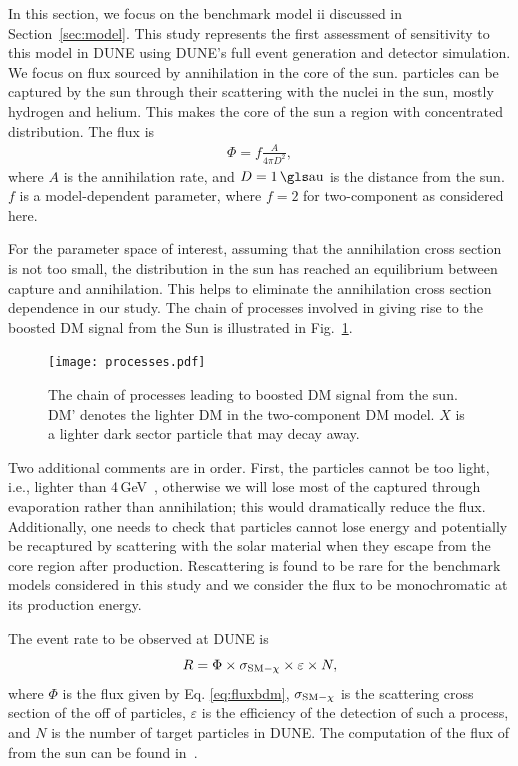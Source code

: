In this section, we focus on the benchmark model ii discussed in Section~\ref{sec:model}. This study represents the first assessment of sensitivity to this model in DUNE using DUNE's full event generation and detector simulation. We focus on  flux sourced by  annihilation in the core of the sun.   particles can be captured by the sun through their scattering with the nuclei in the sun, mostly hydrogen and helium. This makes the core of the sun a region with concentrated  distribution. The  flux is
\begin{eqnarray} \label{eq:fluxbdm}
\Phi= f \frac{A}{4\pi D^2},
\end{eqnarray}
where $A$ is the annihilation rate, and $D = 1\,\rm{\dword{au}}$ is the distance from the sun. $f$ is a model-dependent parameter, where $f = 2$ for two-component  as considered here.

For the parameter space of interest, %
assuming that the 
 annihilation cross section is not too small, the  distribution in the sun has reached an equilibrium between capture and annihilation. This helps to eliminate the annihilation cross section dependence in our study. The chain of processes involved in giving rise to the boosted DM signal from the Sun is illustrated in Fig.~\ref{fig:processes}.
\begin{figure}[h!]
  \centering
  \texttt{[image: processes.pdf]}
  \caption[Processes leading to boosted DM signal from the sun]{The chain of processes leading to boosted DM signal from the sun. DM' denotes the lighter DM in the two-component DM model. $X$ is a lighter dark sector particle that may decay away.}
    \label{fig:processes}
\end{figure}

Two additional comments are in order. First, the  particles cannot be too light, i.e.,  lighter than 4\,GeV~\cite{Griest:1986yu,Gould:1987ju}, otherwise we will lose most of the captured  through evaporation rather than annihilation; this would dramatically reduce the  flux. Additionally, one needs to check that  particles cannot lose energy and potentially be recaptured by scattering with the solar material when they escape from the core region after production. Rescattering is found to be rare for the benchmark models considered in this study and we consider the  flux to be monochromatic at its production energy.

The event rate to be observed at DUNE is 
\begin{equation}
R = \Phi \times \sigma_{\rm{SM} - \chi} \times \varepsilon \times N,
\end{equation}
 where $\Phi$ is the flux given by Eq. \eqref{eq:fluxbdm}, $\sigma_{\rm{SM} - \chi}$ is the scattering cross section of the  off of  particles, $\varepsilon$ is the efficiency of the detection of such a process, and $N$ is the number of target particles in DUNE. The computation of the flux of  from the sun can be found in~\cite{Berger:2014sqa}. 
 
